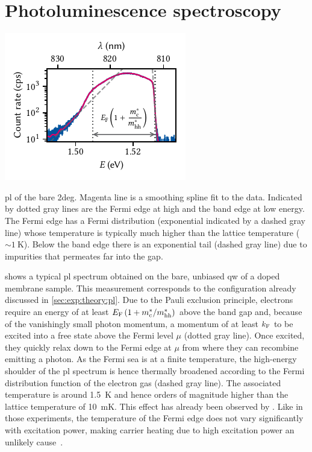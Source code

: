 \section{Photoluminescence spectroscopy}\label{sec:exp:observations:pl}

\begin{marginfigure}
    \centering
    \includegraphics{img/pdf/experiment/2deg_pl}
    \caption[
        .
        \protect\newline
    ]{
        \Gls{pl} of the bare \gls{2deg}.
        Magenta line is a smoothing spline fit to the data.
        Indicated by dotted gray lines are the Fermi edge at high and the band edge at low energy.
        The Fermi edge has a Fermi distribution (exponential indicated by a dashed gray line) whose temperature is typically much higher than the lattice temperature ($\sim\qty{1}{\kelvin}$).
        Below the band edge there is an exponential tail (dashed gray line) due to impurities that permeates far into the gap.
    }
    \label{fig:exp:pl:2deg}
\end{marginfigure}

 shows a typical \gls{pl} spectrum obtained on the bare, unbiased \gls{qw} of a doped membrane sample.
This measurement corresponds to the configuration already discussed in \cref{sec:exp:theory:pl}.
Due to the Pauli exclusion principle, electrons require an energy of at least $E_{\mathrm{F}}\left(1 + m_{\mathrm{c}}^\ast/m_{\mathrm{hh}}^\ast\right)$ above the band gap and, because of the vanishingly small photon momentum, a momentum of at least $k_{\mathrm{F}}$ to be excited into a free state above the Fermi level $\mu$ (dotted gray line).
Once excited, they quickly relax down to the Fermi edge at $\mu$ from where they can recombine emitting a photon.
As the Fermi sea is at a finite temperature, the high-energy shoulder of the \gls{pl} spectrum is hence thermally broadened according to the Fermi distribution function of the electron gas (dashed gray line).
The associated temperature is around \qty{1.5}{\kelvin} and hence orders of magnitude higher than the lattice temperature of \qty{10}{\milli\kelvin}.
This effect has already been observed by \citet{Pinczuk1984}.
Like in those experiments, the temperature of the Fermi edge does not vary significantly with excitation power, making carrier heating due to high excitation power an unlikely cause~\cite{Ulbrich1973}.

